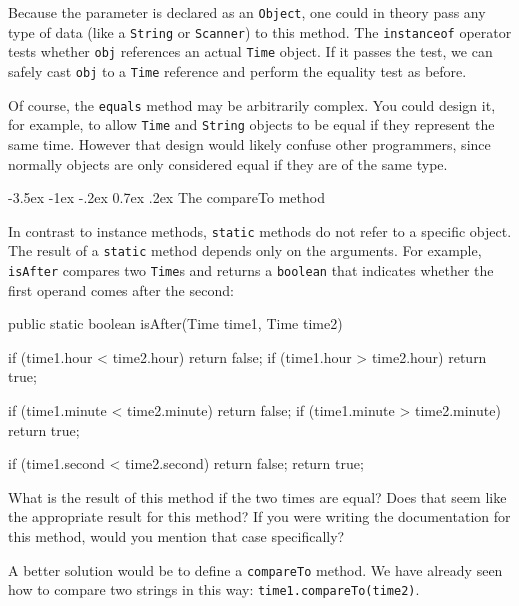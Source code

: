 \documentclass[12pt]{book}
\makeatletter
\renewcommand{\section}{\@startsection {section}{1}{\z@}%
    {-3.5ex \@plus -1ex \@minus -.2ex}%
    {0.7ex \@plus.2ex}%
    {\normalfont\Large\bfseries}}
\theoremstyle{exercise}
\newcommand{\java}[1]{\lstinline{#1}} %
\makeatother
\begin{document}
Because the parameter is declared as an \java{Object}, one could in theory pass any type of data (like a \java{String} or \java{Scanner}) to this method.
The \java{instanceof} operator tests whether \java{obj} references an actual \java{Time} object.
If it passes the test, we can safely cast \java{obj} to a \java{Time} reference and perform the equality test as before.

Of course, the \java{equals} method may be arbitrarily complex.
You could design it, for example, to allow \java{Time} and \java{String} objects to be equal if they represent the same time.
However that design would likely confuse other programmers, since normally objects are only considered equal if they are of the same type.


\section{The compareTo method}


In contrast to instance methods, \java{static} methods do not refer to a specific object.
The result of a \java{static} method depends only on the arguments.
For example, \java{isAfter} compares two \java{Time}s and returns a \java{boolean} that indicates whether the first operand comes after the second:

\begin{code}
    public static boolean isAfter(Time time1, Time time2) {
        if (time1.hour < time2.hour) return false;
        if (time1.hour > time2.hour) return true;

        if (time1.minute < time2.minute) return false;
        if (time1.minute > time2.minute) return true;

        if (time1.second < time2.second) return false;
        return true;
    }
\end{code}

What is the result of this method if the two times are equal?
Does that seem like the appropriate result for this method?
If you were writing the documentation for this method, would you mention that case specifically?

A better solution would be to define a \java{compareTo} method.
We have already seen how to compare two strings in this way: \java{time1.compareTo(time2)}.
\end{document}
